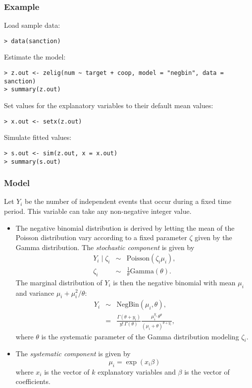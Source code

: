 \subsubsection{Example}

Load sample data:  
\begin{verbatim}
> data(sanction)
\end{verbatim}
Estimate the model:  
\begin{verbatim}
> z.out <- zelig(num ~ target + coop, model = "negbin", data = sanction)
> summary(z.out)
\end{verbatim}
Set values for the explanatory variables to their default mean values:  
\begin{verbatim}
> x.out <- setx(z.out)
\end{verbatim}
Simulate fitted values:  
\begin{verbatim}
> s.out <- sim(z.out, x = x.out)
> summary(s.out)
\end{verbatim}

\subsubsection{Model}
Let $Y_i$ be the number of independent events that occur during a
fixed time period. This variable can take any non-negative integer value.

\begin{itemize}
\item The negative binomial distribution is derived by letting the
  mean of the Poisson distribution vary according to a fixed
  parameter $\zeta$ given by the Gamma distribution. The
  \emph{stochastic component} is given by
   \begin{eqnarray*}
     Y_i \mid \zeta_i & \sim & \textrm{Poisson}(\zeta_i \mu_i),\\
     \zeta_i & \sim & \frac{1}{\theta}\textrm{Gamma}(\theta).
   \end{eqnarray*}
   The marginal distribution of $Y_i$ is then the negative binomial
   with mean $\mu_i$ and variance $\mu_i + \mu_i^2/\theta$:
   \begin{eqnarray*}
   Y_i & \sim & \textrm{NegBin}(\mu_i, \theta), \\
       & = & \frac{\Gamma (\theta + y_i)}{y! \, \Gamma(\theta)} 
             \frac{\mu_i^{y_i} \, \theta^{\theta}}{(\mu_i + \theta)^{\theta + y_i}},
   \end{eqnarray*}
   where $\theta$ is the systematic parameter of the Gamma
   distribution modeling $\zeta_i$.  

 \item The \emph{systematic component} is given by
   \begin{equation*}
     \mu_i = \exp(x_i \beta)
   \end{equation*}
   where $x_i$ is the vector of $k$ explanatory variables and $\beta$ is
   the vector of coefficients.
 \end{itemize}

